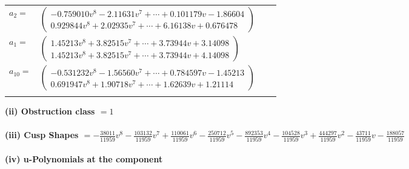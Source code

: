 \documentclass[1p]{elsarticle_modified}
\theoremstyle{definition}
\begin{document}
\begin{tabular}{m{7pt} m{180pt} m{7pt} m{180pt} }
\flushright $a_{2}=$&$\begin{pmatrix}-0.759010 v^{8}-2.11631 v^{7}+\cdots+0.101179 v-1.86604\\0.929844 v^{8}+2.02935 v^{7}+\cdots+6.16138 v+0.676478\end{pmatrix}$ \\
\flushright $a_{1}=$&$\begin{pmatrix}1.45213 v^{8}+3.82515 v^{7}+\cdots+3.73944 v+3.14098\\1.45213 v^{8}+3.82515 v^{7}+\cdots+3.73944 v+4.14098\end{pmatrix}$ \\
\flushright $a_{10}=$&$\begin{pmatrix}-0.531232 v^{8}-1.56560 v^{7}+\cdots+0.784597 v-1.45213\\0.691947 v^{8}+1.90718 v^{7}+\cdots+1.62639 v+1.21114\end{pmatrix}$\\&\end{tabular}
\flushleft \textbf{(ii) Obstruction class $= 1$}\\~\\
\flushleft \textbf{(iii) Cusp Shapes $= -\frac{38011}{11959} v^8-\frac{103132}{11959} v^7+\frac{110061}{11959} v^6-\frac{250712}{11959} v^5-\frac{892353}{11959} v^4-\frac{104528}{11959} v^3+\frac{444297}{11959} v^2-\frac{43711}{11959} v-\frac{188057}{11959}$}\\~\\
\newpage\renewcommand{\arraystretch}{1}
\flushleft \textbf{(iv) u-Polynomials at the component}\newline \\
\end{document}
